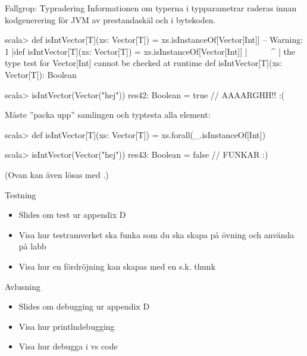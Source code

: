 \begin{Slide}{Fallgrop: Typradering }\SlideFontSmall
Informationen om typerna i typparametrar raderas innan kodgenerering för JVM av prestandaskäl och  i bytekoden.
\vspace{-0.25em}\begin{REPL}
scala> def isIntVector[T](xs: Vector[T]) = xs.isInstanceOf[Vector[Int]]
-- Warning:
1 |def isIntVector[T](xs: Vector[T]) = xs.isInstanceOf[Vector[Int]]
  |                                    ^^^^^^^^^^^^^^^^^^^^^^^^^^^^
  |                the type test for Vector[Int] cannot be checked at runtime
def isIntVector[T](xs: Vector[T]): Boolean

scala> isIntVector(Vector("hej"))
res42: Boolean = true  // AAAARGHH!! :(
\end{REPL}
Måste ''packa upp'' samlingen och typtesta alla element:
\begin{REPL}
scala> def isIntVector[T](xs: Vector[T]) = xs.forall(_.isInstanceOf[Int])

scala> isIntVector(Vector("hej"))
res43: Boolean = false  // FUNKAR :)

\end{REPL}
(Ovan kan även lösas med .)

\end{Slide}


\begin{Slide}{Testning}
\TODO 
\begin{itemize}
\item Slides om test ur appendix D
\item Visa hur testramverket ska funka som du ska skapa på övning och använda på labb
\item Visa hur en fördröjning kan skapas med en s.k. thunk 
\end{itemize}
\end{Slide}


\begin{Slide}{Avlusning}
\TODO 
\begin{itemize}
\item Slides om debugging ur appendix D
\item Visa hur printlndebugging
\item Visa hur debugga i vs code
\end{itemize}
\end{Slide}



